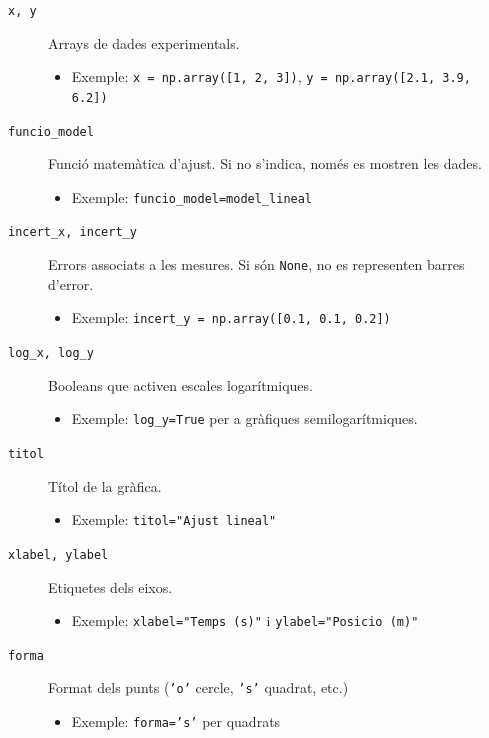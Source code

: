 \documentclass[11pt,a4paper]{article}
\begin{document}
\begin{description}
  \item[\texttt{x, y}] Arrays de dades experimentals. 
    \begin{itemize}
      \item Exemple: \texttt{x = np.array([1, 2, 3])}, \texttt{y = np.array([2.1, 3.9, 6.2])}
    \end{itemize}

  \item[\texttt{funcio\_model}] Funció matemàtica d’ajust. Si no s’indica, només es mostren les dades.
    \begin{itemize}
      \item Exemple: \texttt{funcio\_model=model\_lineal}
    \end{itemize}

  \item[\texttt{incert\_x, incert\_y}] Errors associats a les mesures. Si són \texttt{None}, no es representen barres d’error.
    \begin{itemize}
      \item Exemple: \texttt{incert\_y = np.array([0.1, 0.1, 0.2])}
    \end{itemize}

  \item[\texttt{log\_x, log\_y}] Booleans que activen escales logarítmiques.
    \begin{itemize}
      \item Exemple: \texttt{log\_y=True} per a gràfiques semilogarítmiques.
    \end{itemize}

  \item[\texttt{titol}] Títol de la gràfica.
    \begin{itemize}
      \item Exemple: \texttt{titol="Ajust lineal"}
    \end{itemize}

  \item[\texttt{xlabel, ylabel}] Etiquetes dels eixos.
    \begin{itemize}
      \item Exemple: \texttt{xlabel="Temps (s)"} i \texttt{ylabel="Posicio (m)"}
    \end{itemize}

  \item[\texttt{forma}] Format dels punts (\texttt{'o'} cercle, \texttt{'s'} quadrat, etc.)
    \begin{itemize}
      \item Exemple: \texttt{forma='s'} per quadrats
    \end{itemize}


\end{description}
\end{document}
